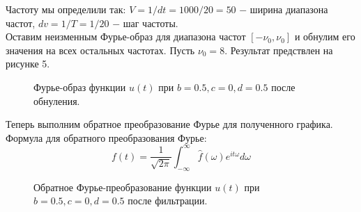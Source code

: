 \documentclass[a5paper, 10pt]{article}
\theoremstyle{definition}
\theoremstyle{plain}
\theoremstyle{remark}
\begin{document}
Частоту мы определили так: $V = 1 / dt = 1000 / 20 = 50$ $-$ ширина диапазона частот, $dv = 1 / T = 1 / 20$ $-$ шаг частоты.\\

Оставим неизменным Фурье-образ для диапазона частот $[-\nu_0, \nu_0]$ и обнулим его значения на всех остальных частотах. Пусть $\nu_0 = 8$. Результат предствлен на рисунке 5.

\begin{figure}[h!]
\caption{Фурье-образ функции $u(t)$ при $b = 0.5, c = 0, d = 0.5$ после обнуления.}
\end{figure}



\newpage
Теперь выполним обратное преобразование Фурье для полученного графика. \\
Формула для обратного преобразования Фурье:
\begin{equation}
  f(t) = \frac{1}{\sqrt{2 \pi}} \int_{-\infty}^{\infty}\hat{f}(\omega) e^{i t \omega} d \omega
\end{equation}

\begin{figure}[h!]
\caption{Обратное Фурье-преобразование функции $u(t)$ при $b = 0.5, c = 0, d = 0.5$ после фильтрации.}
\end{figure}
\end{document}
